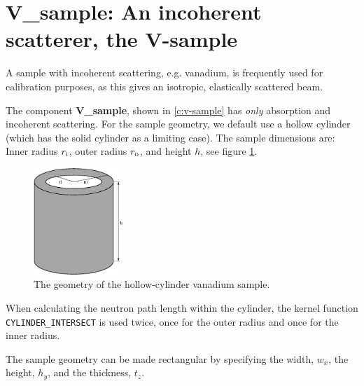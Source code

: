 

\section{V\_sample: An incoherent scatterer, the V-sample}
\label{s:v_sample}


A sample with incoherent scattering, e.g. vanadium, is frequently used for
calibration purposes, as this gives an isotropic, elastically scattered beam.

The component {\bf V\_sample}, shown in \ref{c:v-sample}
has {\em only} absorption and incoherent scattering.
For the sample geometry, we default use a
hollow cylinder (which has the solid cylinder as a limiting case).
The sample dimensions are: Inner radius $r_{\rm i}$,
outer radius $r_{\rm o}$, and height $h$, see figure \ref{f:v-sample}.
\begin{figure}
  \begin{center}
    \includegraphics[width=0.3\textwidth]{figures/vsample.eps}
  \end{center}
\caption{The geometry of the hollow-cylinder vanadium sample.}
\label{f:v-sample}
\end{figure}

When calculating the neutron path length within
the cylinder, the kernel function
\verb+CYLINDER_INTERSECT+
is used twice, once for the outer radius and once
for the inner radius.

The sample geometry can be made rectangular by specifying the width, $w_x$, the
height, $h_y$, and the thickness, $t_z$.

